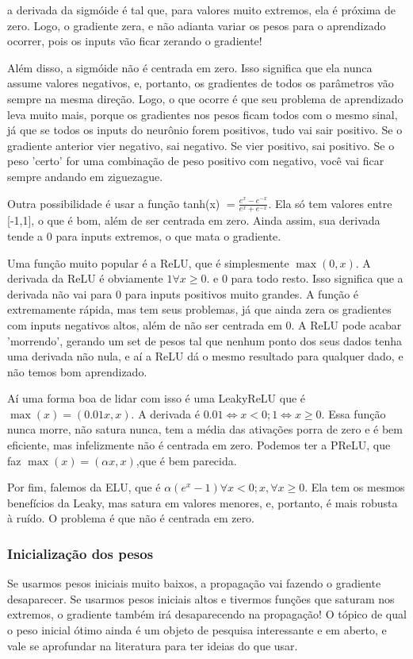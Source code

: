 \documentclass{article}
\begin{document}
a derivada da sigmóide é tal que, para valores muito extremos, ela é próxima de zero. Logo, o gradiente zera, e não adianta variar os pesos para o aprendizado ocorrer, pois os inputs vão ficar zerando o gradiente! \par
Além disso, a sigmóide não é centrada em zero. Isso significa que ela nunca assume valores negativos, e, portanto, os gradientes de todos os parâmetros vão sempre na mesma direção.
Logo, o que ocorre é que seu problema de aprendizado leva muito mais, porque os gradientes nos pesos ficam todos com o mesmo sinal, já que se todos os inputs do neurônio forem positivos, tudo vai sair positivo. Se o gradiente anterior vier negativo, sai negativo. Se vier positivo, sai positivo. Se o peso 'certo' for uma combinação de peso positivo com negativo, você vai ficar sempre andando em ziguezague.\par
Outra possibilidade é usar a função tanh(x) $ = \frac{e^x - e^{-x}}{e^x + e^{-x}}$. Ela só tem valores entre [-1,1], o que é bom, além de ser centrada em zero. Ainda assim, sua derivada tende a 0 para inputs extremos, o que mata o gradiente. \par
Uma função muito popular é a ReLU, que é simplesmente $\max(0,x)$. A derivada da ReLU é obviamente $1 \forall x \geq 0$. e 0 para todo resto. Isso significa que a derivada não vai para 0 para inputs positivos muito grandes. A função é extremamente rápida, mas tem seus problemas, já que ainda zera os gradientes com inputs negativos altos, além de não ser centrada em 0. A ReLU pode acabar 'morrendo', gerando um set de pesos tal que nenhum ponto dos seus dados tenha uma derivada não nula, e aí a ReLU dá o mesmo resultado para qualquer dado, e não temos bom aprendizado. \par
Aí uma forma boa de lidar com isso é uma LeakyReLU que é $\max(x) = (0.01x, x)$. A derivada é $0.01 \iff x < 0; 1 \iff x \geq 0$. Essa função nunca morre, não satura nunca, tem a média das ativações porra de zero e é bem eficiente, mas infelizmente não é centrada em zero. Podemos ter a PReLU, que faz $\max(x) = (\alpha x, x)$,que é bem parecida. \par
Por fim, falemos da ELU, que é $\alpha(e^x - 1) \forall x < 0; x, \forall x \geq 0$. Ela tem os mesmos benefícios da Leaky, mas satura em valores menores, e, portanto, é mais robusta à ruído. O problema é que não é centrada em zero. 
\subsubsection{Inicialização dos pesos}
Se usarmos pesos iniciais muito baixos, a propagação vai fazendo o gradiente desaparecer. Se usarmos pesos iniciais altos e tivermos funções que saturam nos extremos, o gradiente também irá desaparecendo na propagação! O tópico de qual o peso inicial ótimo ainda é um objeto de pesquisa interessante e em aberto, e vale se aprofundar na literatura para ter ideias do que usar. 
\end{document}
